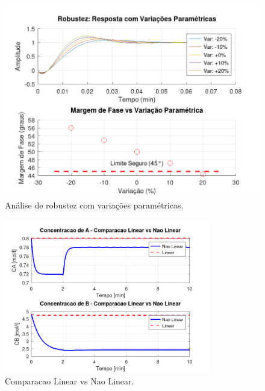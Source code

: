 \documentclass[a4paper,12pt]{article}
\begin{document}
\begin{figure}[H]
    \centering
    \includegraphics[width=\textwidth]{figura_analise_robustez.png}
    \caption{Análise de robustez com variações paramétricas.}
    \label{fig:robustez_main}
\end{figure}

\begin{figure}[H]
    \centering
    \includegraphics[width=0.8\textwidth]{figura_comparacao_linear_naolinear.png}
    \caption{Comparacao Linear vs Nao Linear.}
    \label{fig:comparacao_linear_naolinear}
\end{figure}
\end{document}

